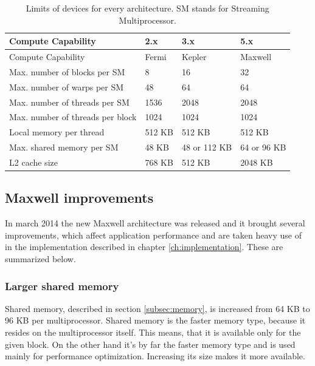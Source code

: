 \begin{table}[htbp]
\begin{center}
\begin{tabularx}{0.75\textwidth}{| X | X | X | X |}
\hline
Compute Capability & 2.x & 3.x & 5.x \\
\hline
Compute Capability & Fermi & Kepler & Maxwell \\
\hline
Max. number of blocks per SM & 8 & 16 & 32 \\
\hline
Max. number of warps per SM & 48 & 64 & 64 \\
\hline
Max. number of threads per SM & 1536 & 2048 & 2048 \\
\hline
Max. number of threads per block & 1024 & 1024 & 1024 \\
\hline
Local memory per thread & 512 KB & 512 KB & 512 KB \\
\hline
Max. shared memory per SM & 48 KB & 48 or 112 KB & 64 or 96 KB \\
\hline
L2 cache size & 768 KB & 512 KB & 2048 KB \\
\hline
\end{tabularx}
\end{center}
\caption{Limits of devices for every architecture. SM stands for Streaming Multiprocessor.}
\label{tab:compute-capability}
\end{table}

\subsection{Maxwell improvements}\label{subsec:cuda-maxwell-imp}

In march 2014 the new Maxwell architecture was released and it brought several improvements, which affect application performance and are taken heavy use of in the implementation described in chapter \ref{ch:implementation}. These are summarized below.

\subsubsection{Larger shared memory}

Shared memory, described in section \ref{subsec:memory}, is increased from 64 KB to 96 KB per multiprocessor. Shared memory is the faster memory type, because it resides on the multiprocessor itself. This means, that it is available only for the given block. On the other hand it's by far the faster memory type and is used mainly for performance optimization. Increasing its size makes it more available.

